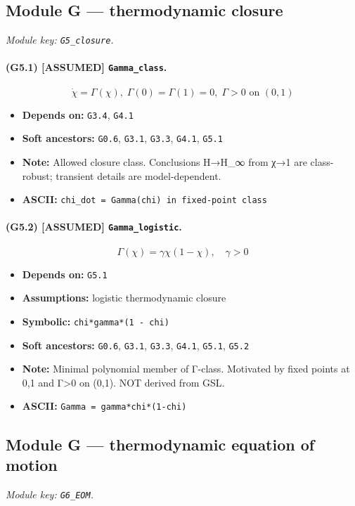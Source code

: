 \documentclass[11pt,a4paper]{article}
\theoremstyle{remark}\newtheorem*{caution}{Caution}
\newcommand{\tagbox}[1]{\textsc{[#1]}}
\begin{document}
\subsection{Module G --- thermodynamic closure}
\textit{Module key: \texttt{G5\_closure}.}
\paragraph{(G5.1) \tagbox{ASSUMED} \texttt{Gamma\_class}.}
\begin{equation}
\dot\chi=\Gamma(\chi),\;\Gamma(0)=\Gamma(1)=0,\;\Gamma>0\text{ on }(0,1)
\tag{G5.1}
\end{equation}
\begin{itemize}\setlength{\itemsep}{0.12em}
\item \textbf{Depends on:} \texttt{G3.4}, \texttt{G4.1}
\item \textbf{Soft ancestors:} \texttt{G0.6}, \texttt{G3.1}, \texttt{G3.3}, \texttt{G4.1}, \texttt{G5.1}
\item \textbf{Note:} Allowed closure class. Conclusions H→H\_∞ from χ→1 are class-robust; transient details are model-dependent.
\item \textbf{ASCII:} \texttt{chi\_dot = Gamma(chi) in fixed-point class}
\end{itemize}
\paragraph{(G5.2) \tagbox{ASSUMED} \texttt{Gamma\_logistic}.}
\begin{equation}
\Gamma(\chi)=\gamma\chi(1-\chi),\quad\gamma>0
\tag{G5.2}
\end{equation}
\begin{itemize}\setlength{\itemsep}{0.12em}
\item \textbf{Depends on:} \texttt{G5.1}
\item \textbf{Assumptions:} logistic thermodynamic closure
\item \textbf{Symbolic:} \texttt{chi*gamma*(1 - chi)}
\item \textbf{Soft ancestors:} \texttt{G0.6}, \texttt{G3.1}, \texttt{G3.3}, \texttt{G4.1}, \texttt{G5.1}, \texttt{G5.2}
\item \textbf{Note:} Minimal polynomial member of Γ-class. Motivated by fixed points at 0,1 and Γ>0 on (0,1). NOT derived from GSL.
\item \textbf{ASCII:} \texttt{Gamma = gamma*chi*(1-chi)}
\end{itemize}
\subsection{Module G --- thermodynamic equation of motion}
\textit{Module key: \texttt{G6\_EOM}.}
\end{document}
